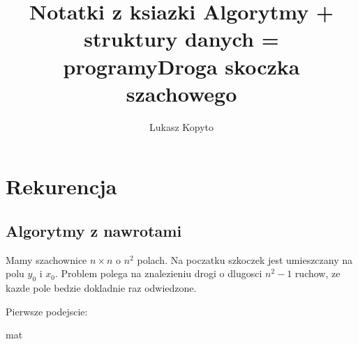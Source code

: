 \documentclass{article}
\author{Lukasz Kopyto}
\title{Notatki z ksiazki Algorytmy + struktury danych = programy}
\begin{document}
\maketitle     %

\section{Rekurencja}
\subsection{Algorytmy z nawrotami}
\title{Droga skoczka szachowego}


Mamy szachownice $n \times n$ o $n^{2}$ polach. Na poczatku szkoczek jest umieszczany na polu $y_{0}$ i $x_{0}$. Problem polega na znalezieniu drogi o dlugosci $n^{2}-1$ ruchow, ze kazde pole bedzie dokladnie raz odwiedzone.

Pierwsze podejscie:

mat
\end{document}
